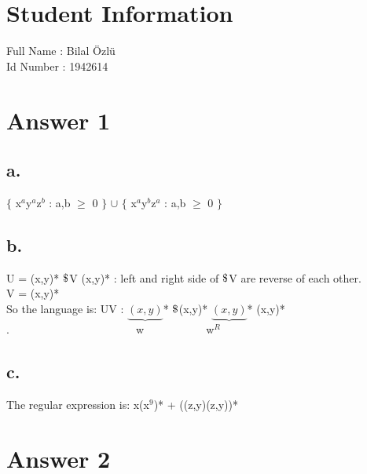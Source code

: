 \documentclass[12pt]{article}
\begin{document}
\section*{Student Information } 
Full Name : Bilal Özlü \\
Id Number : 1942614 \\

\section*{Answer 1}

\subsection*{a.}
$\lbrace$ x$^a$y$^a$z$^b$ : a,b $\geq$ 0 $\rbrace$  $\cup$  $\lbrace$ x$^a$y$^b$z$^a$ : a,b $\geq$ 0 $\rbrace$ \\

\subsection*{b.}
U = (x,y)* $\char36$V (x,y)* : left and right side of $\char36$V are reverse of each other. \\
V = (x,y)* \\
So the language is: UV : $\underbrace{(x,y)}$* $\char36$(x,y)* $\underbrace{(x,y)}$* (x,y)* \\
.$\hspace{138pt}$w$\hspace{68pt}$w$^R$ \\

\subsection*{c.}
The regular expression is: x(x$^9$)* + ((z,y)(z,y))* \\

\section*{Answer 2}
\end{document}
